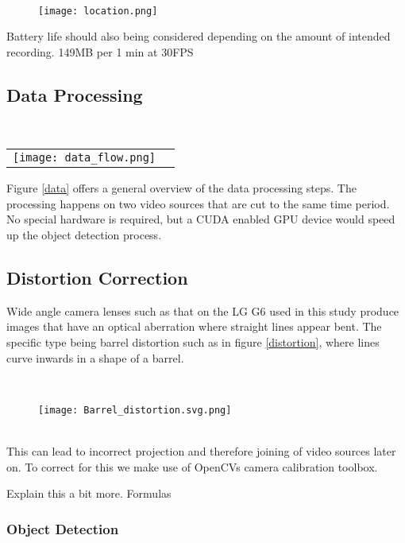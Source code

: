 \ \\ 
  \begin{figure}[h]
    \texttt{[image: location.png]}
    \centering 
    \end{figure}
    \label{Camera location}

Battery life should also being considered depending on the amount of intended recording. 149MB per 1 min at 30FPS

\subsection{Data Processing}

\ \\ 
\noindent
\begin{tabular}{@{}cc}
\texttt{[image: data\_flow.png]} 
\end{tabular}
\label{data}


Figure \ref{data} offers a general overview of the data processing steps. The processing happens on two 
video sources that are cut to the same time period. No special hardware is required, but a CUDA enabled GPU
device would speed up the object detection process.
\ \\
\subsection{Distortion Correction}

Wide angle camera lenses such as that on the LG G6 used in this study produce images that have an optical aberration where straight lines appear bent. 
The specific type being barrel distortion such as in figure \ref{distortion}, where lines curve inwards in a shape of a barrel.

\ \\ 
\begin{figure}[h]
  \texttt{[image: Barrel\_distortion.svg.png]}
  \centering 
  \end{figure}
  \label{distortion}

\ \\
This can lead to incorrect projection and therefore joining of video sources later on.
To correct for this we make use of OpenCVs \cite{noauthor_opencv/opencv_2021} camera calibration toolbox.

Explain this a bit more. Formulas
\ \\
\subsubsection{Object Detection}

